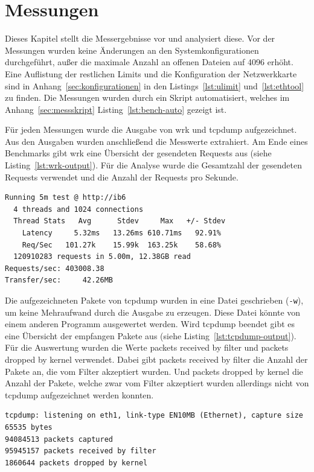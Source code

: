 \section{Messungen}
\label{sec:messungen}

Dieses Kapitel stellt die Messergebnisse vor und analysiert diese. Vor der
Messungen wurden keine Änderungen an den Systemkonfigurationen durchgeführt,
außer die maximale Anzahl an offenen Dateien auf 4096 erhöht. Eine Auflistung
der restlichen Limits und die Konfiguration der Netzwerkkarte sind in
Anhang~\ref{sec:konfigurationen} in den Listings~\ref{lst:ulimit}
und~\ref{lst:ethtool} zu finden. Die Messungen wurden durch ein Skript
automatisiert, welches im Anhang~\ref{sec:messskript}
Listing~\ref{lst:bench-auto} gezeigt ist.

Für jeden Messungen wurde die Ausgabe von wrk und tcpdump aufgezeichnet. Aus
den Ausgaben wurden anschließend die Messwerte extrahiert. Am Ende eines
Benchmarks gibt wrk eine Übersicht der gesendeten Requests aus (siehe
Listing~\ref{lst:wrk-output}). Für die Analyse wurde die Gesamtzahl der
gesendeten Requests verwendet und die Anzahl der Requests pro Sekunde.

\begin{lstlisting}[caption={Ausgabe von wrk},label=lst:wrk-output]
Running 5m test @ http://ib6
  4 threads and 1024 connections
  Thread Stats   Avg      Stdev     Max   +/- Stdev
    Latency     5.32ms   13.26ms 610.71ms   92.91%
    Req/Sec   101.27k    15.99k  163.25k    58.68%
  120910283 requests in 5.00m, 12.38GB read
Requests/sec: 403008.38
Transfer/sec:     42.26MB
\end{lstlisting}

Die aufgezeichneten Pakete von tcpdump wurden in eine Datei geschrieben
(\texttt{-w}), um keine Mehraufwand durch die Ausgabe zu erzeugen.  Diese Datei
könnte von einem anderen Programm ausgewertet werden. Wird tcpdump beendet gibt
es eine Übersicht der empfangen Pakete aus (siehe
Listing~\ref{lst:tcpdump-output}). Für die Auswertung wurden die Werte \glqq{}
packets received by filter\grqq{} und \glqq{}packets dropped by kernel\grqq{}
verwendet. Dabei gibt \glqq{} packets received by filter\grqq{} die Anzahl der
Pakete an, die vom Filter akzeptiert wurden. Und \glqq{}packets dropped by
kernel\grqq{} die Anzahl der Pakete, welche zwar vom Filter akzeptiert wurden
allerdings nicht von tcpdump aufgezeichnet werden konnten.

\begin{lstlisting}[caption={Ausgabe von tcpdump},label=lst:tcpdump-output]
tcpdump: listening on eth1, link-type EN10MB (Ethernet), capture size 65535 bytes
94084513 packets captured
95945157 packets received by filter
1860644 packets dropped by kernel
\end{lstlisting}

